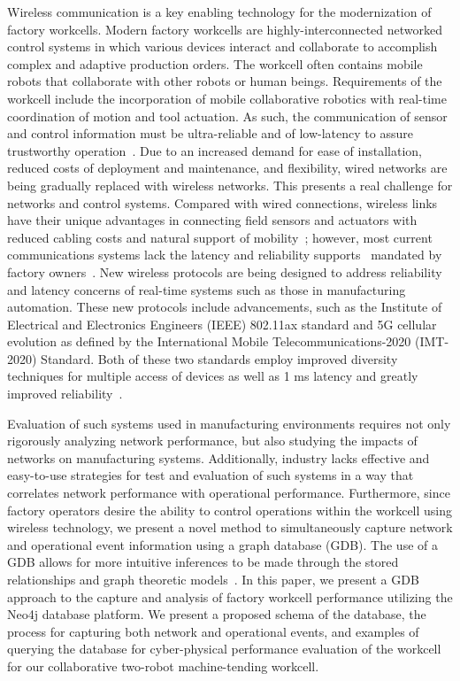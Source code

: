 Wireless communication is a key enabling technology for the modernization of factory workcells. Modern factory workcells are highly-interconnected networked control systems in which various devices interact and collaborate to accomplish complex and adaptive production orders. The workcell often contains mobile robots that collaborate with other robots or human beings. Requirements of the workcell include the incorporation of mobile collaborative robotics with real-time coordination of motion and tool actuation.  As such, the communication of sensor and control information must be ultra-reliable and of low-latency to assure trustworthy operation~\cite{wirelessAutomation2017}. Due to an increased demand for ease of installation, reduced costs of deployment and maintenance, and flexibility, wired networks are being gradually replaced with wireless networks. This presents a real challenge for networks and control systems. Compared with wired connections, wireless links have their unique advantages in connecting field sensors and actuators with reduced cabling costs and natural support of mobility~\cite{ieMag2018}; however, most current communications systems lack the latency and reliability supports~\cite{etsi103588} mandated by factory owners~\cite{Industry40, SmartManuf}.  New wireless protocols are being designed to address reliability and latency concerns of real-time systems such as those in manufacturing automation.  These new protocols include advancements, such as the Institute of Electrical and Electronics Engineers (IEEE) 802.11ax standard and 5G cellular evolution as defined by the International Mobile Telecommunications-2020 (IMT-2020) Standard.  Both of these two standards employ improved diversity techniques for multiple access of devices as well as 1 ms latency and greatly improved reliability~\cite{80211ax}. 

Evaluation of such systems used in manufacturing environments requires not only rigorously analyzing  network performance, but also studying the impacts of networks on manufacturing systems. Additionally, industry lacks effective and easy-to-use strategies for test and evaluation of such systems in a way that correlates network performance with operational performance. Furthermore, since factory operators desire the ability to control operations within the workcell using wireless technology, we present a novel method to simultaneously capture network and operational event information using a graph database (GDB).  The use of a GDB allows for more intuitive inferences to be made through the stored relationships and graph theoretic models~\cite{Angles:2008:SGD:1322432.1322433}. In this paper, we present a GDB approach to the capture and analysis of factory workcell performance utilizing the Neo4j database platform. We present a proposed schema of the database, the process for capturing both network and operational events, and examples of querying the database for cyber-physical performance evaluation of the workcell for our collaborative two-robot machine-tending workcell\cite{Liu2019vancouver}.

